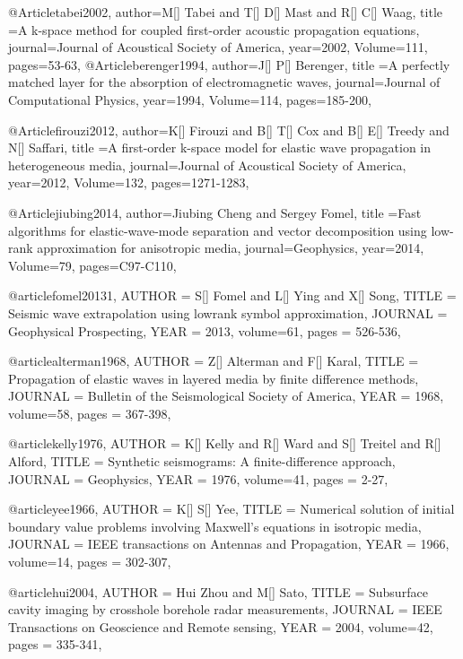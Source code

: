 {@Article{tabei2002,
  author={M[] Tabei and T[] D[] Mast and R[] C[] Waag},
  title ={A k-space method for coupled first-order acoustic propagation equations},
  journal={Journal of Acoustical Society of America},
  year=2002,
  Volume=111,
  pages={53-63},
}
@Article{berenger1994,
  author={J[] P[] Berenger},
  title ={A perfectly matched layer for the absorption of electromagnetic waves},
  journal={Journal of Computational Physics},
  year=1994,
  Volume=114,
  pages={185-200},
}

@Article{firouzi2012,
  author={K[] Firouzi and B[] T[] Cox and B[] E[] Treedy and N[] Saffari},
  title ={A first-order k-space model for elastic wave propagation in heterogeneous media},
  journal={Journal of Acoustical Society of America},
  year=2012,
  Volume=132,
  pages={1271-1283},
}


@Article{jiubing2014,
  author={Jiubing Cheng and Sergey Fomel},
  title ={Fast algorithms for elastic-wave-mode separation and vector decomposition using low-rank approximation for anisotropic media},
  journal={Geophysics},
  year=2014,
  Volume=79,
  pages={C97-C110},
}

@article{fomel20131,
  AUTHOR =       {S[] Fomel and L[] Ying and X[] Song},
  TITLE =        {Seismic wave extrapolation using lowrank symbol approximation},
  JOURNAL =      {Geophysical Prospecting},
  YEAR =         {2013},
  volume=61,
  pages = {526-536},
}

@article{alterman1968,
  AUTHOR =       {Z[] Alterman and F[] Karal},
  TITLE =        {Propagation of elastic waves in layered media by finite difference methods},
  JOURNAL =      {Bulletin of the Seismological Society of America},
  YEAR =         {1968},
  volume=58,
  pages = {367-398},
}

@article{kelly1976,
  AUTHOR =       {K[] Kelly and R[] Ward and S[] Treitel and R[] Alford},
  TITLE =        {Synthetic seismograms: A finite-difference approach},
  JOURNAL =      {Geophysics},
  YEAR =         {1976},
  volume=41,
  pages = {2-27},
}

@article{yee1966,
  AUTHOR =       {K[] S[] Yee},
  TITLE =        {Numerical solution of initial boundary value problems involving Maxwell's equations in isotropic media},
  JOURNAL =      {IEEE transactions on Antennas and Propagation},
  YEAR =         {1966},
  volume=14,
  pages = {302-307},
}

@article{hui2004,
  AUTHOR =       {Hui Zhou and M[] Sato},
  TITLE =        {Subsurface cavity imaging by crosshole borehole radar measurements},
  JOURNAL =      {IEEE Transactions on Geoscience and Remote sensing},
  YEAR =         {2004},
  volume=42,
  pages = {335-341},
}

}
